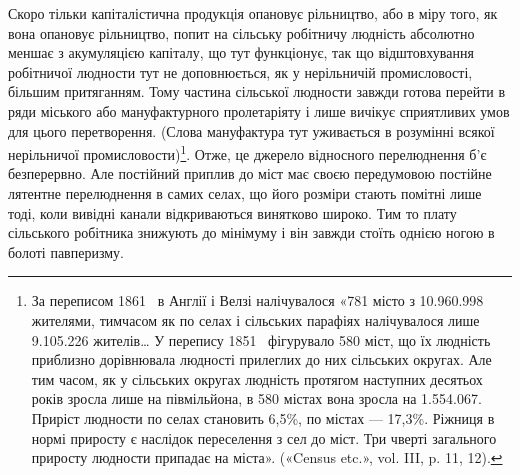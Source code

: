 Скоро тільки капіталістична продукція опановує рільництво, або в міру того, як вона опановує
рільництво, попит на сільську робітничу людність абсолютно меншає з акумуляцією капіталу, що тут
функціонує, так що відштовхування робітничої людности
тут не доповнюється, як у нерільничій промисловості, більшим притяганням. Тому частина сільської
людности завжди готова перейти в ряди міського або мануфактурного пролетаріяту і лише вичікує
сприятливих умов для цього перетворення. (Слова мануфактура тут уживається в розумінні всякої
нерільничої
промисловости)\footnote{
За переписом 1861~ в Англії і Велзі налічувалося «781 місто з \num{10.960.998} жителями, тимчасом як
по селах і сільських парафіях налічувалося лише \num{9.105.226} жителів\dots{} У перепису 1851~ фігурувало
580 міст, що їх людність приблизно дорівнювала людності прилеглих до них
сільських округах. Але тим часом, як у сільських округах людність протягом наступних десятьох років
зросла лише на півмільйона, в 580 містах вона зросла на \num{1.554.067}. Приріст людности по селах
становить 6,5\%, по містах — 17,3\%. Ріжниця в нормі приросту є наслідок переселення з сел до міст.
Три чверті загального приросту людности припадає на міста». («Census etc.», vol. III, p. 11, 12).
}. Отже, це джерело відносного перелюднення
б’є безперервно. Але постійний приплив до міст має своєю передумовою постійне лятентне перелюднення
в самих селах, що його розміри стають помітні лише тоді, коли вивідні канали відкриваються винятково
широко. Тим то плату сільського робітника
знижують до мінімуму і він завжди стоїть однією ногою в болоті павперизму.

